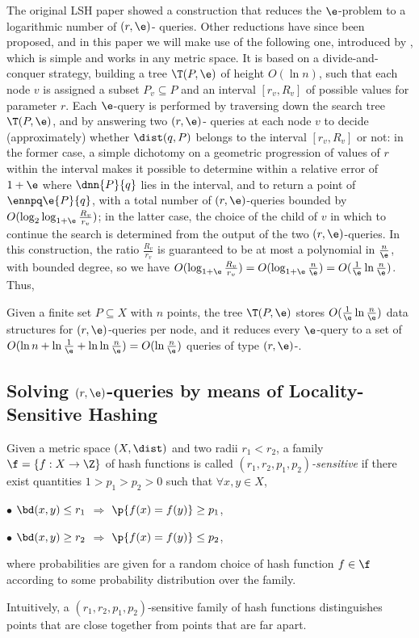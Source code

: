 The original LSH paper \citep{IM98} showed a construction that reduces
the $\e$-\nn problem to a logarithmic number of $(r,\e)$-\pleb
queries. Other reductions have since been proposed, and in this paper
we will make use of the following one, introduced by \citet{HarPeled01},
which is simple and works in any metric space. It is based on
a divide-and-conquer strategy, building a tree $\T(P,\e)$ of height
$O(\ln n)$, such that each node $v$ is assigned a subset
$P_v\subseteq P$ and an interval $[r_v, R_v]$ of possible values for
parameter $r$.  Each $\e$-\nn query is performed by traversing down
the search tree $\T(P,\e)$, and by answering two $(r, \e)$-\pleb
queries at each node $v$ to decide (approximately) whether
$\dist(q,P)$ belongs to the interval $[r_v, R_v]$ or not: in the
former case, a simple dichotomy on a geometric progression of values
of $r$ within the interval makes it possible to determine within a
relative error of $1+\e$ where $\dnn{P}{q}$ lies in the interval, and
to return a point of $\ennpq\e{P}{q}$, with a total number of $(r,
\e)$-\pleb queries bounded by $O(\log_2 \log_{1+\e} \frac{R_v}{r_v})$;
in the latter case, the choice of the child of $v$ in which to
continue the search is determined from the output of the two $(r,
\e)$-\pleb queries. In this construction, the ratio $\frac{R_v}{r_v}$
is guaranteed to be at most a polynomial in $\frac{n}{\e}$, with
bounded degree, so we have $O(\log_{1+\e}\frac{R_v}{r_v}) =
O(\log_{1+\e}\frac{n}{\e})= O(\frac{1}{\e}\ln \frac{n}{\e})$.  Thus,
\begin{thm} \label{thm:cnn} 
Given a finite set $P\subseteq X$ with $n$ points, the tree $\T(P,\e)$
stores $O(\frac{1}{\e}\ln \frac{n}{\e})$ data structures for
$(r,\e)$-\pleb queries per node, and it reduces every $\e$-\nn query
to a set of $O(\ln n + \ln
\frac{1}{\e}+\ln\ln\frac{n}{\e})=O(\ln \frac{n}{\e})$ queries of type
$(r,\e)$-\pleb.
 \end{thm}

\subsection{Solving $(r,\e)$-\pleb queries by means of Locality-Sensitive Hashing}
\label{sec:lsh-ernn}

\begin{defn}\label{def:lshashfunc}
  Given a metric space $(X,\dist)$ and two radii $r_1<r_2$, a family
  $\f=\{f:X\rightarrow \Z\}$ of hash functions is called {\em
    $(r_1,r_2,p_1,p_2)$-sensitive} if there exist quantities $1> p_1 >
  p_2 > 0$ such that $\forall x,y\in X$,
  \begin{slist}
  \item[$\bullet$] $\bd(x,y)\leq r_1$ $\Rightarrow$ $\p{f(x)=f(y)}\geq p_1$,
  \item[$\bullet$] $\bd(x,y)\geq r_2$ $\Rightarrow$ $\p{f(x)=f(y)}\leq p_2$,
  \end{slist}
  where probabilities are given for a random choice of hash
  function $f\in \f$ according to some probability distribution
  over the family.
\end{defn}
Intuitively, a $(r_1,r_2,p_1,p_2)$-sensitive family of hash functions
distinguishes points that are close together from points
that are far apart. 

